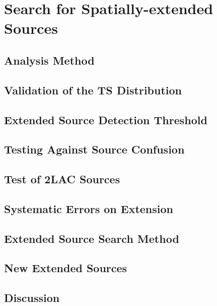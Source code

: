 
\chapter{Search for Spatially-extended Sources}

\section{Analysis Method}

\section{Validation of the TS Distribution}

\section{Extended Source Detection Threshold}

\section{Testing Against Source Confusion}

\section{Test of 2LAC Sources}

\section{Systematic Errors on Extension}

\section{Extended Source Search Method}

\section{New Extended Sources}

\section{Discussion}
